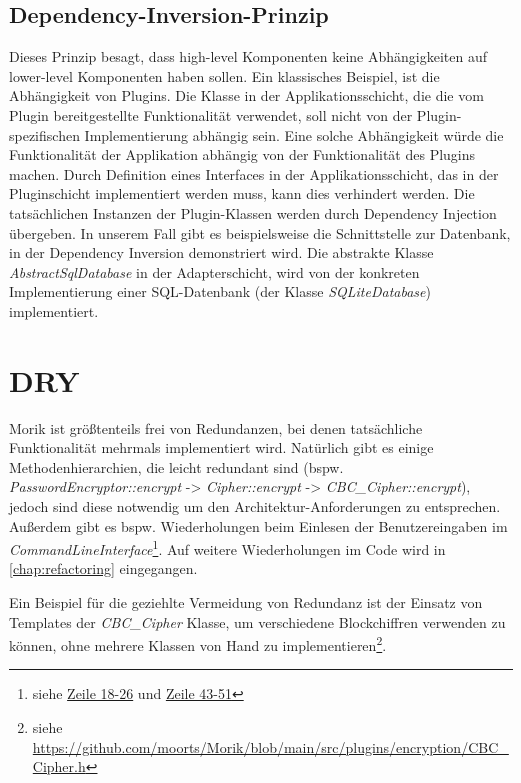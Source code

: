 \subsection{Dependency-Inversion-Prinzip}

Dieses Prinzip besagt, dass high-level Komponenten keine Abhängigkeiten auf lower-level Komponenten haben sollen. Ein klassisches Beispiel, ist die Abhängigkeit von Plugins. Die Klasse in der Applikationsschicht, die die vom Plugin bereitgestellte Funktionalität verwendet, soll nicht von der Plugin-spezifischen Implementierung abhängig sein. Eine solche Abhängigkeit würde die Funktionalität der Applikation abhängig von der Funktionalität des Plugins machen. Durch Definition eines Interfaces in der Applikationsschicht, das in der Pluginschicht implementiert werden muss, kann dies verhindert werden. Die tatsächlichen Instanzen der Plugin-Klassen werden durch Dependency Injection übergeben. In unserem Fall gibt es beispielsweise die Schnittstelle zur Datenbank, in der Dependency Inversion demonstriert wird. Die abstrakte Klasse \textit{AbstractSqlDatabase} in der Adapterschicht, wird von der konkreten Implementierung einer SQL-Datenbank (der Klasse \textit{SQLiteDatabase}) implementiert.

\section{DRY}

Morik ist größtenteils frei von Redundanzen, bei denen tatsächliche Funktionalität mehrmals implementiert wird. Natürlich gibt es einige Methodenhierarchien, die leicht redundant sind (bspw. \textit{PasswordEncryptor::encrypt} -> \textit{Cipher::encrypt} -> \textit{CBC\_Cipher::encrypt}), jedoch sind diese notwendig um den Architektur-Anforderungen zu entsprechen. Außerdem gibt es bspw. Wiederholungen beim Einlesen der Benutzereingaben im \textit{CommandLineInterface}\footnote{siehe \href{https://github.com/moorts/Morik/blob/fc02135ce2d842324fcd5adfbcbe4857f6a7169b/src/plugins/ui/CommandLineInterface.cpp\#L18}{Zeile 18-26} und \href{https://github.com/moorts/Morik/blob/fc02135ce2d842324fcd5adfbcbe4857f6a7169b/src/plugins/ui/CommandLineInterface.cpp\#L43}{Zeile 43-51}}. Auf weitere Wiederholungen im Code wird in \autoref{chap:refactoring} eingegangen.

Ein Beispiel für die geziehlte Vermeidung von Redundanz ist der Einsatz von Templates der \textit{CBC\_Cipher} Klasse, um verschiedene Blockchiffren verwenden zu können, ohne mehrere Klassen von Hand zu implementieren\footnote{siehe \url{https://github.com/moorts/Morik/blob/main/src/plugins/encryption/CBC_Cipher.h}}.

